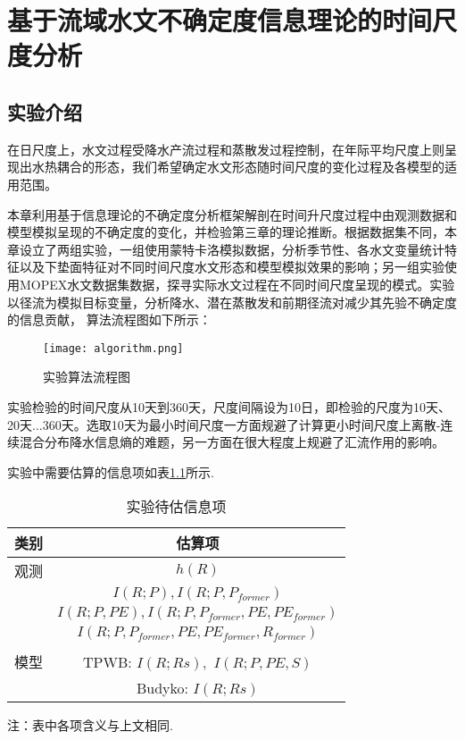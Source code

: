 

\chapter{基于流域水文不确定度信息理论的时间尺度分析}
\label{cha:intro}
\section{实验介绍}
在日尺度上，水文过程受降水产流过程和蒸散发过程控制，在年际平均尺度上则呈现出水热耦合的形态，我们希望确定水文形态随时间尺度的变化过程及各模型的适用范围。

本章利用基于信息理论的不确定度分析框架解剖在时间升尺度过程中由观测数据和模型模拟呈现的不确定度的变化，并检验第三章的理论推断。根据数据集不同，本章设立了两组实验，一组使用蒙特卡洛模拟数据，分析季节性、各水文变量统计特征以及下垫面特征对不同时间尺度水文形态和模型模拟效果的影响；另一组实验使用MOPEX水文数据集\citep{duan2006model}数据，探寻实际水文过程在不同时间尺度呈现的模式。实验以径流为模拟目标变量，分析降水、潜在蒸散发和前期径流对减少其先验不确定度的信息贡献，
算法流程图如下所示：
\begin{figure}[H]
\centering
\texttt{[image: algorithm.png]}
\caption{实验算法流程图}
\label{algorithm}
\end{figure}
实验检验的时间尺度从10天到360天，尺度间隔设为10日，即检验的尺度为10天、20天...360天。选取10天为最小时间尺度一方面规避了计算更小时间尺度上离散-连续混合分布降水信息熵的难题\cite{gong2014estimating}，另一方面在很大程度上规避了汇流作用的影响。

实验中需要估算的信息项如表\ref{lalala}所示.
\begin{table}[H] 
\centering
\caption{实验待估信息项}
\label{lalala}
\begin{tabular}{cc}
\toprule[1.5 pt] 
 类别  &  估算项 \\
\midrule[1.0 pt] 
观测   &$h(R)$ \\

 &$I(R;P),I(R;P,P_{former})$\\
 &
$I(R;P,PE),I(R;P,P_{former},PE,PE_{former})$\\
 &
$I(R;P,P_{former}, PE,PE_{former},R_{former})$\\
\\
模型  & TPWB: $I(R;Rs),$ $I(R;P,PE,S)$  \\
 & Budyko:  $I(R;Rs)$\\
\bottomrule[1.5 pt] 
\end{tabular}

\footnotesize{注：表中各项含义与上文相同.}
\end{table}

